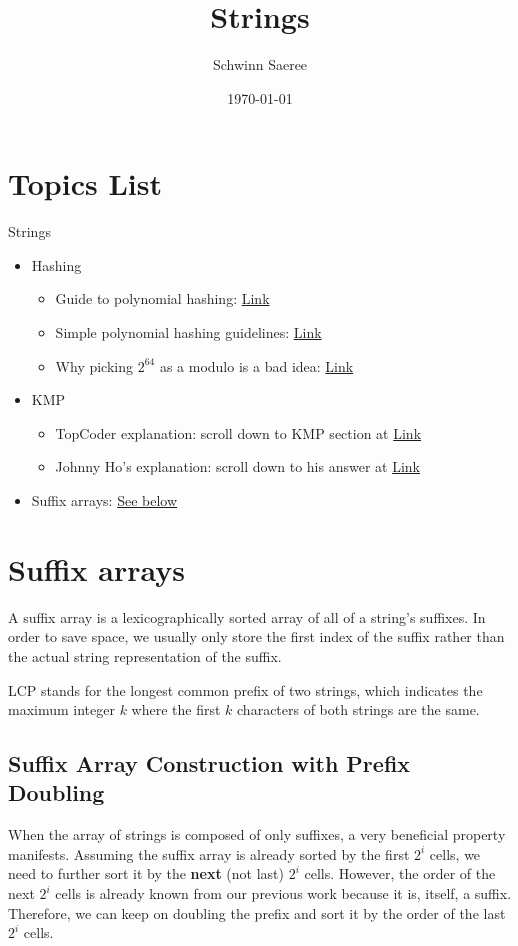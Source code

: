 \documentclass[11pt]{article}
\author{Schwinn Saeree}
\date{\today}
\title{Strings}
\begin{document}
\maketitle
\section*{Topics List}
\label{sec:orgcc3113b}
Strings
\begin{itemize}
\item Hashing
\begin{itemize}
\item Guide to polynomial hashing: \href{https://www.mii.lt/olympiads\_in\_informatics/pdf/INFOL119.pdf}{Link}
\item Simple polynomial hashing guidelines: \href{https://codeforces.com/blog/entry/52697}{Link}
\item Why picking \(2^{64}\) as a modulo is a bad idea: \href{https://codeforces.com/blog/entry/4898}{Link}
\end{itemize}
\item KMP
\begin{itemize}
\item TopCoder explanation: scroll down to KMP section at \href{https://www.topcoder.com/community/competitive-programming/tutorials/introduction-to-string-searching-algorithms/}{Link}
\item Johnny Ho's explanation: scroll down to his answer at \href{https://www.quora.com/Why-is-the-time-complexity-of-the-Knuth-Morris-Pratt-algorithm-O-n}{Link}
\end{itemize}
\item Suffix arrays: \hyperref[sakasai]{See below}
\end{itemize}

\section*{\label{sakasai}Suffix arrays}
\label{sec:orgca49046}

A suffix array is a lexicographically sorted array of all of a string's suffixes. In order to save space, we usually only store the first index of the suffix rather than the actual string representation of the suffix.

LCP stands for the longest common prefix of two strings, which indicates the maximum integer \(k\) where the first \(k\) characters of both strings are the same.

\subsection*{Suffix Array Construction with Prefix Doubling}
\label{sec:orgd97564c}
When the array of strings is composed of only suffixes, a very beneficial property manifests. Assuming the suffix array is already sorted by the first \(2^i\) cells, we need to further sort it by the \textbf{\textbf{next}} (not last) \(2^i\) cells. However, the order of the next \(2^i\) cells is already known from our previous work because it is, itself, a suffix. Therefore, we can keep on doubling the prefix and sort it by the order of the last \(2^i\) cells.
\end{document}
